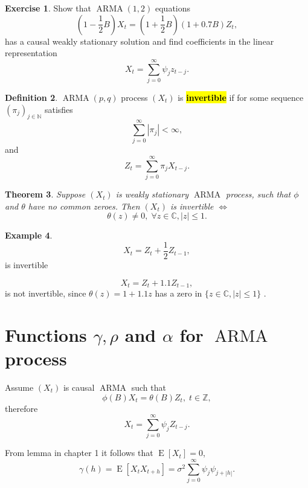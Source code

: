 \documentclass[12pt,a4paper, notitlepage]{book}
\newcommand{\hlc}[2][yellow]{ {\sethlcolor{#1} \hl{#2}} }
\newcommand{\hlcr}[1]{\hlc[lightred]{#1}}
\theoremstyle{definition} %
\newtheorem{definition}{Definition}[section]
\newtheorem{example}[definition]{Example}
\newtheorem{exercise}[definition]{Exercise}
\theoremstyle{plain} %
\newtheorem{theorem}[definition]{Theorem}
\newcommand{\N}{\mathbb N}
\newcommand{\Z}{\mathbb Z}
\newcommand{\C}{\mathbb C}
\DeclareMathOperator{\E}{E}
\DeclareMathOperator{\Arma}{ARMA}
\newcommand{\New}[1]{ {\bf \hlcr{#1} } }
\begin{document}
\begin{exercise}
Show that $ \Arma(1,2) $ equations 
\[  (1 - \frac{1}{2} B) X_t = (1 + \frac{1}{2} B) (1 + 0.7 B) Z_t , \]
has a causal weakly stationary solution and find coefficients in the linear representation 
\[ X_t = \sum _{j=0} ^{\infty} \psi _j z_{t-j} . \]
\end{exercise}



\begin{definition}
$\Arma(p,q) $ process $ (X_t) $ is \New{invertible} if for some sequence  $ ( \pi _j) _{j \in \N } $ satisfies
\[ \sum _{j=0} ^{\infty} | \pi _j| < \infty , \]
and 
\[ Z_t = \sum _{j=0} ^{\infty} \pi _j X_{t-j} . \]
\end{definition}

 
\begin{theorem}
Suppose $ (X_t) $  is weakly stationary $ \Arma $ process, such that $ \phi $ and $ \theta $ have
no common zeroes. Then $ (X_t ) $ is invertible $ \iff $ 
\[ \theta (z) \neq 0 , \; \forall z \in \C, |z| \leq 1 . \]
\end{theorem}

\begin{example}
\[ X_t = Z_t + \frac{1}{2} Z_{t-1} , \] 
is invertible

\[ X_t = Z_t + 1.1 Z_{t-1} , \]
is not invertible, since $ \theta (z) = 1 + 1.1 z $ has a zero in $ \{ z\in \C , |z| \leq 1 \} $ .
\end{example}



\section{ Functions $ \gamma, \rho $ and $ \alpha $ for  $ \Arma $ process }

Assume $ (X_t ) $ is causal $ \Arma $ such that 
\[ \phi (B) X_t = \theta (B) Z_t , \; t \in \Z , \]
therefore 
\[ X_t = \sum _{j=0} ^{\infty} \psi _j Z_{t-j} . \]

From lemma in chapter 1 %
it follows that $ \E [ X_t ] = 0 $, 
\[ \gamma (h) = \E\left[ X_t X_{t+h} \right] = \sigma ^2 \sum_ {j=0} ^{\infty} \psi _j \psi _{j+|h|} . \]
\end{document}
